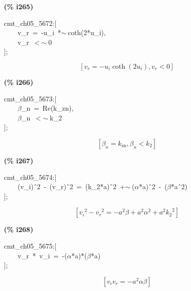 \documentclass[fleqn]{article}
\begin{document}
\noindent
\begin{minipage}[t]{4.000000em}\color{red}\bfseries
(\% i265)	
\end{minipage}
\begin{minipage}[t]{\textwidth}\color{blue}
cmt\_ch05\_5672:[\\
\ \ \ \ v\_r\ =\ -u\_i\ *\ensuremath{\sim\ }coth(2*u\_i),\\
\ \ \ \ v\_r\ \ensuremath{<}\ensuremath{\sim\ }0\\
];
\end{minipage}
\[\displaystyle \tag{\% o265} 
\left[ {v_r}=-{u_i} \operatorname{coth}\left( 2 {u_i}\right) \operatorname{,}{v_r}\operatorname{<  }0\right] \mbox{}
\]


\noindent
\begin{minipage}[t]{4.000000em}\color{red}\bfseries
(\% i266)	
\end{minipage}
\begin{minipage}[t]{\textwidth}\color{blue}
cmt\_ch05\_5673:[\\
\ \ \ \ \ensuremath{\beta}\_n\ =\ Re(k\_zn),\ \\
\ \ \ \ \ensuremath{\beta}\_n\ \ensuremath{<}\ensuremath{\sim\ }k\_2\\
];
\end{minipage}
\[\displaystyle \tag{\% o266} 
\left[ {{\beta }_n}={k_{\ensuremath{\mathrm{zn}}}}\operatorname{,}{{\beta }_n}\operatorname{<  }{k_2}\right] \mbox{}
\]


\noindent
\begin{minipage}[t]{4.000000em}\color{red}\bfseries
(\% i267)	
\end{minipage}
\begin{minipage}[t]{\textwidth}\color{blue}
cmt\_ch05\_5674:[\\
\ \ \ \ (v\_i)\^\ 2\ -\ (v\_r)\^\ 2\ =\ (k\_2*a)\^\ 2\ +\ensuremath{\sim\ }(\ensuremath{\alpha}*a)\^\ 2\ -\ (\ensuremath{\beta}*a\^\ 2)\\
];
\end{minipage}
\[\displaystyle \tag{\% o267} 
\left[ {{{v_i}}^{2}}-{{{v_r}}^{2}}=-{{a}^{2}} \beta +{{a}^{2}} {{\alpha }^{2}}+{{a}^{2}} {{{k_2}}^{2}}\right] \mbox{}
\]


\noindent
\begin{minipage}[t]{4.000000em}\color{red}\bfseries
(\% i268)	
\end{minipage}
\begin{minipage}[t]{\textwidth}\color{blue}
cmt\_ch05\_5675:[\\
\ \ \ \ v\_r\ *\ v\_i\ =\ -(\ensuremath{\alpha}*a)*(\ensuremath{\beta}*a)\\
];
\end{minipage}
\[\displaystyle \tag{\% o268} 
\left[ {v_i} {v_r}=-{{a}^{2}} \alpha  \beta \right] \mbox{}
\]
\end{document}
